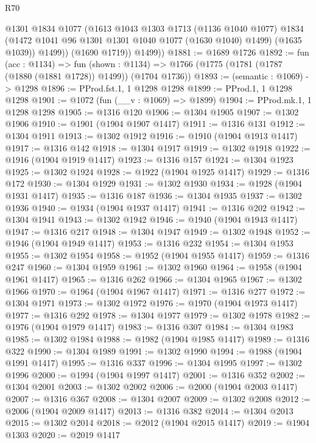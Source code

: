\begin{lexlean}{R70}
\begin{coremodule}
              @1301
              @1834
              @1077
              (@1613
                @1043
                @1303
                @1713
                (@1136 @1040 @1077)
                @1834
                (@1472 @1041 @96 @1301 @1301 @1040 @1077 (@1630 @1040) @1499)
                (@1635 @1039))
              @1499))
          (@1690 @1719))
        @1499))
@1881 := @1689 @1726
@1892 := fun (acc : @1134) =>
  fun (shown : @1134) => @1766 (@1775 (@1781 (@1787 (@1880 (@1881 @1728)) @1499)) (@1704 @1736))
@1893 := (semantic : @1069) -> @1298
@1896 := PProd.fst.{1, 1} @1298 @1298
@1899 := PProd.{1, 1} @1298 @1298
@1901 := @1072 (fun (__v : @1069) => @1899)
@1904 := PProd.mk.{1, 1} @1298 @1298
@1905 := @1316 @120
@1906 := @1304 @1905
@1907 := @1302 @1906
@1910 := @1901 (@1904 @1907 @1417)
@1911 := @1316 @131
@1912 := @1304 @1911
@1913 := @1302 @1912
@1916 := @1910 (@1904 @1913 @1417)
@1917 := @1316 @142
@1918 := @1304 @1917
@1919 := @1302 @1918
@1922 := @1916 (@1904 @1919 @1417)
@1923 := @1316 @157
@1924 := @1304 @1923
@1925 := @1302 @1924
@1928 := @1922 (@1904 @1925 @1417)
@1929 := @1316 @172
@1930 := @1304 @1929
@1931 := @1302 @1930
@1934 := @1928 (@1904 @1931 @1417)
@1935 := @1316 @187
@1936 := @1304 @1935
@1937 := @1302 @1936
@1940 := @1934 (@1904 @1937 @1417)
@1941 := @1316 @202
@1942 := @1304 @1941
@1943 := @1302 @1942
@1946 := @1940 (@1904 @1943 @1417)
@1947 := @1316 @217
@1948 := @1304 @1947
@1949 := @1302 @1948
@1952 := @1946 (@1904 @1949 @1417)
@1953 := @1316 @232
@1954 := @1304 @1953
@1955 := @1302 @1954
@1958 := @1952 (@1904 @1955 @1417)
@1959 := @1316 @247
@1960 := @1304 @1959
@1961 := @1302 @1960
@1964 := @1958 (@1904 @1961 @1417)
@1965 := @1316 @262
@1966 := @1304 @1965
@1967 := @1302 @1966
@1970 := @1964 (@1904 @1967 @1417)
@1971 := @1316 @277
@1972 := @1304 @1971
@1973 := @1302 @1972
@1976 := @1970 (@1904 @1973 @1417)
@1977 := @1316 @292
@1978 := @1304 @1977
@1979 := @1302 @1978
@1982 := @1976 (@1904 @1979 @1417)
@1983 := @1316 @307
@1984 := @1304 @1983
@1985 := @1302 @1984
@1988 := @1982 (@1904 @1985 @1417)
@1989 := @1316 @322
@1990 := @1304 @1989
@1991 := @1302 @1990
@1994 := @1988 (@1904 @1991 @1417)
@1995 := @1316 @337
@1996 := @1304 @1995
@1997 := @1302 @1996
@2000 := @1994 (@1904 @1997 @1417)
@2001 := @1316 @352
@2002 := @1304 @2001
@2003 := @1302 @2002
@2006 := @2000 (@1904 @2003 @1417)
@2007 := @1316 @367
@2008 := @1304 @2007
@2009 := @1302 @2008
@2012 := @2006 (@1904 @2009 @1417)
@2013 := @1316 @382
@2014 := @1304 @2013
@2015 := @1302 @2014
@2018 := @2012 (@1904 @2015 @1417)
@2019 := @1904 @1303
@2020 := @2019 @1417

\end{coremodule}
\end{lexlean}
